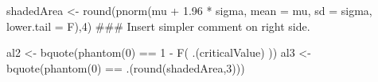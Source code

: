 \begin{Schunk}
\begin{Sinput}
 shadedArea <- round(pnorm(mu + 1.96 * sigma, mean = mu, sd = sigma, lower.tail = F),4)
 ### Insert simpler comment on right side.
 
 al2 <- bquote(phantom(0) == 1 - F( .(criticalValue) ))
 al3 <- bquote(phantom(0) == .(round(shadedArea,3)))
\end{Sinput}
\end{Schunk}

